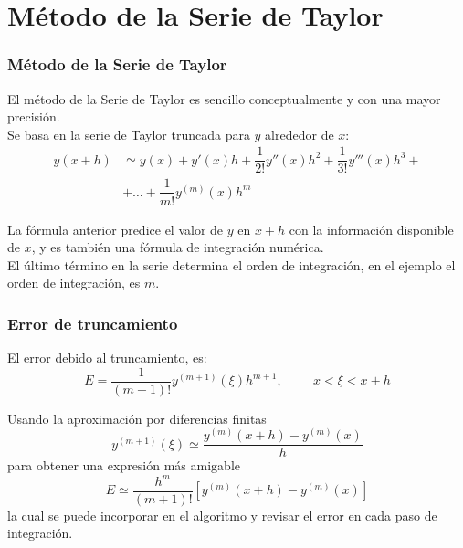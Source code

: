 \section{Método de la Serie de Taylor}
\begin{frame}
\frametitle{Método de la Serie de Taylor}
El método de la Serie de Taylor es sencillo conceptualmente y con una mayor precisión.
\\
\medskip
Se basa en la serie de Taylor truncada para $y$ alrededor de $x$:
\[ \begin{split}
y(x+h) & \simeq y(x) + y'(x) h +  \dfrac{1}{2!} y''(x)h^{2} + \dfrac{1}{3!} y'''(x) h^{3} + \\
& + \ldots + \dfrac{1}{m!} y^{(m)}(x) h^{m} \end{split} \]
\end{frame}
\begin{frame}
La fórmula anterior predice el valor de $y$ en $x+h$ con la información disponible de $x$, y es también una fórmula de integración numérica.
\\
\medskip
El último término en la serie determina el orden de integración, en el ejemplo el orden de integración, es $m$.
\end{frame}
\begin{frame}
\frametitle{Error de truncamiento}
El error debido al truncamiento, es:
\[ E = \dfrac{1}{(m+1)!} y^{(m+1)} (\xi) h^{m+1}, \hspace{1cm} x<\xi<x+h \]
\end{frame}
\begin{frame}
Usando la aproximación por diferencias finitas
\[ y^{(m+1)} (\xi) \simeq \dfrac{y^{(m)}(x+h)-y^{(m)}(x)}{h}\]
para obtener una expresión más amigable
\[ E \simeq \dfrac{h^{m}}{(m+1)!} \left[ y^{(m)}(x+h) - y^{(m)}(x) \right]\]
la cual se puede incorporar en el algoritmo y revisar el error en cada paso de integración.
\end{frame}
